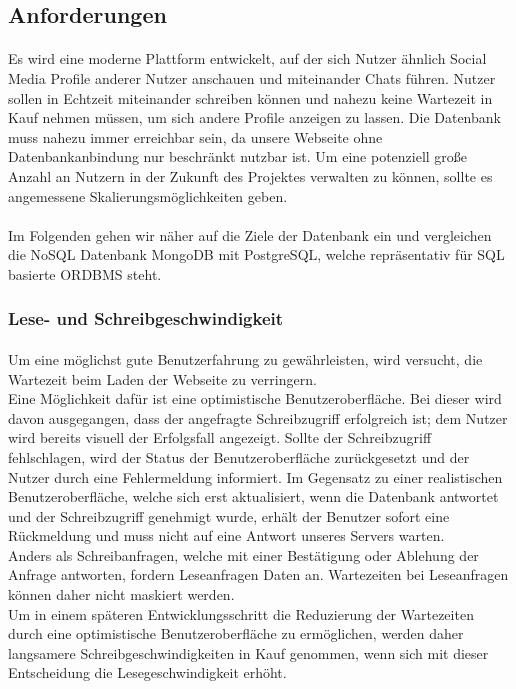 \subsection{Anforderungen}
\paragraph{}
Es wird eine moderne Plattform entwickelt, auf der sich Nutzer ähnlich Social Media Profile anderer Nutzer anschauen und miteinander Chats führen. Nutzer sollen in Echtzeit miteinander schreiben können und nahezu keine Wartezeit in Kauf nehmen müssen, um sich andere Profile anzeigen zu lassen. Die Datenbank muss nahezu immer erreichbar sein, da unsere Webseite ohne Datenbankanbindung nur beschränkt nutzbar ist. Um eine potenziell große Anzahl an Nutzern in der Zukunft des Projektes verwalten zu können, sollte es angemessene Skalierungsmöglichkeiten geben.

\paragraph{}
Im Folgenden gehen wir näher auf die Ziele der Datenbank ein und vergleichen die NoSQL Datenbank MongoDB mit PostgreSQL, welche repräsentativ für SQL basierte ORDBMS steht. 

\subsubsection{Lese- und Schreibgeschwindigkeit}
\paragraph{}
Um eine möglichst gute Benutzerfahrung zu gewährleisten, wird versucht, die Wartezeit beim Laden der Webseite zu verringern.\\
Eine Möglichkeit dafür ist eine optimistische Benutzeroberfläche. Bei dieser wird davon ausgegangen, dass der angefragte Schreibzugriff erfolgreich ist; dem Nutzer wird bereits visuell der Erfolgsfall angezeigt. Sollte der Schreibzugriff fehlschlagen,  wird der Status der Benutzeroberfläche zurückgesetzt und der Nutzer durch eine Fehlermeldung informiert. Im Gegensatz zu einer realistischen Benutzeroberfläche, welche sich erst aktualisiert, wenn die Datenbank antwortet und der Schreibzugriff genehmigt wurde, erhält der Benutzer sofort eine Rückmeldung und muss nicht auf eine Antwort unseres Servers warten.\\
Anders als Schreibanfragen, welche mit einer Bestätigung oder Ablehung der Anfrage antworten, fordern Leseanfragen Daten an. Wartezeiten bei Leseanfragen können daher nicht maskiert werden.\\
Um in einem späteren Entwicklungsschritt die Reduzierung der Wartezeiten durch eine optimistische Benutzeroberfläche zu ermöglichen, werden daher langsamere Schreibgeschwindigkeiten in Kauf genommen, wenn sich mit dieser Entscheidung die Lesegeschwindigkeit erhöht.

